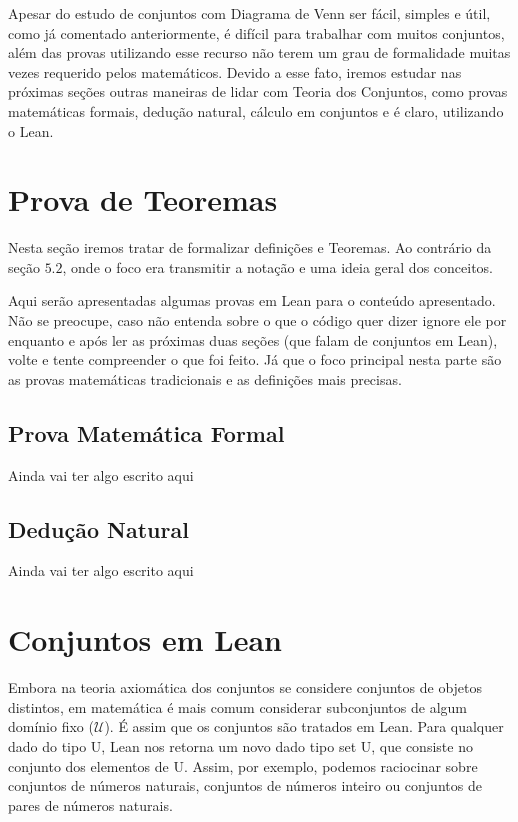   Apesar do estudo de conjuntos com Diagrama de Venn ser fácil, simples e útil, como já comentado anteriormente, é difícil para trabalhar com muitos conjuntos, além das provas utilizando esse recurso não terem um grau de formalidade muitas vezes requerido pelos matemáticos. Devido a esse fato, iremos estudar nas próximas seções outras maneiras de lidar com Teoria dos Conjuntos, como provas matemáticas formais, dedução natural, cálculo em conjuntos e é claro, utilizando o Lean.

\section{Prova de Teoremas}
Nesta seção iremos tratar de formalizar definições e Teoremas. Ao contrário da seção $5.2$, onde o foco era transmitir a notação e uma ideia geral dos conceitos.

Aqui serão apresentadas algumas provas em Lean para o conteúdo apresentado. Não se preocupe, caso não entenda sobre o que o código quer dizer ignore ele por enquanto e após ler as próximas duas seções (que falam de conjuntos em Lean), volte e tente compreender o que foi feito. Já que o foco principal nesta parte são as provas matemáticas tradicionais e as definições mais precisas.

  \subsection{Prova Matemática Formal}
  Ainda vai ter algo escrito aqui

  \subsection{Dedução Natural}
  Ainda vai ter algo escrito aqui

\section{Conjuntos em Lean}
Embora na teoria axiomática dos conjuntos se considere conjuntos de objetos distintos, em matemática é mais comum considerar subconjuntos de algum domínio fixo ($\mathcal U $). É assim que os conjuntos são tratados em Lean. Para qualquer dado do tipo {\selectfont U}, Lean nos retorna um novo dado tipo {\selectfont set U}, que consiste no conjunto dos elementos de {\selectfont U}. Assim, por exemplo, podemos raciocinar sobre conjuntos de números naturais, conjuntos de números inteiro ou conjuntos de pares de números naturais.


